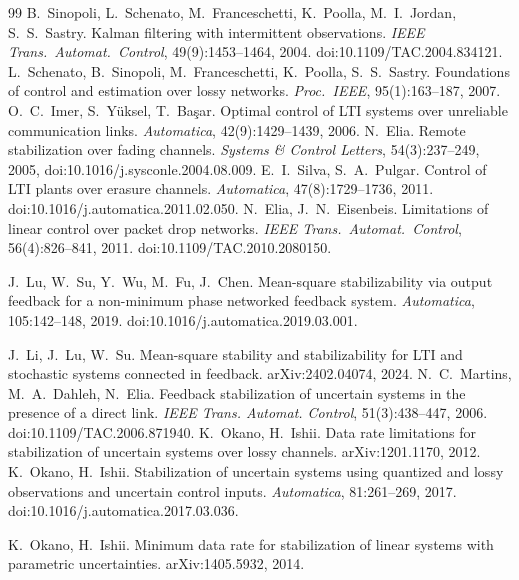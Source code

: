 \documentclass[preprint,12pt,numbers]{elsarticle}
\theoremstyle{definition}
\begin{document}
\begingroup\footnotesize\begin{thebibliography}{99}
 B.~Sinopoli, L.~Schenato, M.~Franceschetti, K.~Poolla, M.~I.~Jordan, S.~S.~Sastry. Kalman filtering with intermittent observations. \emph{IEEE Trans.\ Automat.\ Control}, 49(9):1453--1464, 2004. doi:10.1109/TAC.2004.834121.
 L.~Schenato, B.~Sinopoli, M.~Franceschetti, K.~Poolla, S.~S.~Sastry. Foundations of control and estimation over lossy networks. \emph{Proc.\ IEEE}, 95(1):163--187, 2007.
 O.~C.~Imer, S.~Y\"uksel, T.~Ba\c{s}ar. Optimal control of LTI systems over unreliable communication links. \emph{Automatica}, 42(9):1429--1439, 2006.
 N.~Elia. Remote stabilization over fading channels. \emph{Systems \& Control Letters}, 54(3):237--249, 2005, doi:10.1016/j.sysconle.2004.08.009.
 E.~I.~Silva, S.~A.~Pulgar. Control of LTI plants over erasure channels. \emph{Automatica}, 47(8):1729--1736, 2011. doi:10.1016/j.automatica.2011.02.050.
 N.~Elia, J.~N.~Eisenbeis. Limitations of linear control over packet drop networks. \emph{IEEE Trans.\ Automat.\ Control}, 56(4):826--841, 2011. doi:10.1109/TAC.2010.2080150.


 J.~Lu, W.~Su, Y.~Wu, M.~Fu, J.~Chen. Mean-square stabilizability via output feedback for a non-minimum phase networked feedback system. \emph{Automatica}, 105:142--148, 2019. doi:10.1016/j.automatica.2019.03.001.

 J.~Li, J.~Lu, W.~Su. Mean-square stability and stabilizability for LTI and stochastic systems connected in feedback. arXiv:2402.04074, 2024.
 N.~C.~Martins, M.~A.~Dahleh, N.~Elia. Feedback stabilization of uncertain systems in the presence of a direct link. \emph{IEEE Trans. Automat. Control}, 51(3):438--447, 2006. doi:10.1109/TAC.2006.871940.
 K.~Okano, H.~Ishii. Data rate limitations for stabilization of uncertain systems over lossy channels. arXiv:1201.1170, 2012.
 K.~Okano, H.~Ishii. Stabilization of uncertain systems using quantized and lossy observations and uncertain control inputs. \emph{Automatica}, 81:261--269, 2017. doi:10.1016/j.automatica.2017.03.036.

 K.~Okano, H.~Ishii. Minimum data rate for stabilization of linear systems with parametric uncertainties. arXiv:1405.5932, 2014.


\end{thebibliography}
\end{document}
